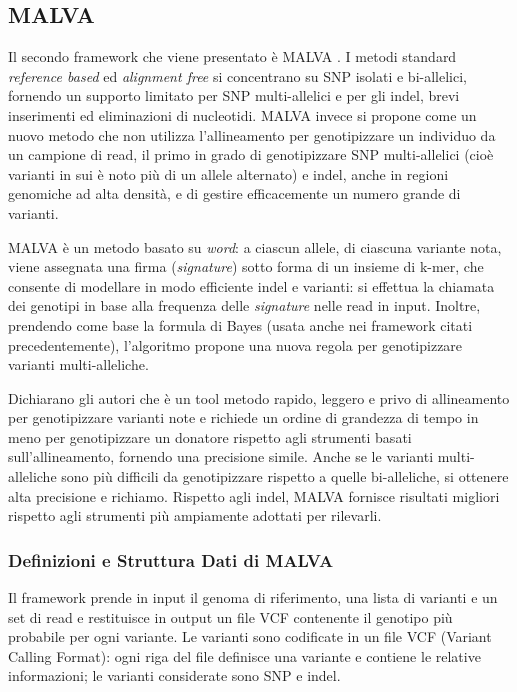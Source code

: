 \documentclass[../main.tex]{subfiles}
\begin{document}
\subsection{MALVA}
\label{malva}

Il secondo framework che viene presentato è MALVA \cite{bernardini2019malva}. I metodi standard \textit{reference based} ed \textit{alignment free} si concentrano su SNP isolati e bi-allelici, fornendo un supporto limitato per SNP multi-allelici e per gli indel, brevi inserimenti ed eliminazioni di nucleotidi. MALVA invece si propone come un nuovo metodo che non utilizza l'allineamento per genotipizzare un individuo da un campione di read, il primo in grado di genotipizzare SNP multi-allelici (cioè varianti in sui è noto più di un allele alternato) e indel, anche in regioni genomiche ad alta densità, e di gestire efficacemente un numero grande di varianti. 

MALVA è un metodo basato su \textit{word}: a ciascun allele, di ciascuna variante nota, viene assegnata una firma (\textit{signature}) sotto forma di un insieme di k-mer, che consente di modellare in modo efficiente indel e varianti: si effettua la chiamata dei genotipi in base alla frequenza delle \textit{signature} nelle read in input. Inoltre, prendendo come base la formula di Bayes (usata anche nei framework citati precedentemente), l'algoritmo propone una nuova regola per genotipizzare varianti multi-alleliche.

Dichiarano gli autori che è un tool metodo rapido, leggero e privo di allineamento per genotipizzare varianti note e richiede un ordine di grandezza di tempo in meno per genotipizzare un donatore rispetto agli strumenti basati sull'allineamento, fornendo una precisione simile. Anche se le varianti multi-alleliche sono più difficili da genotipizzare rispetto a quelle bi-alleliche, si ottenere alta precisione e richiamo. Rispetto agli indel, MALVA fornisce risultati migliori rispetto agli strumenti più ampiamente adottati per rilevarli. 


\subsubsection{Definizioni e Struttura Dati di MALVA}

Il framework prende in input il genoma di riferimento, una lista di varianti e un set di read e restituisce in output un file VCF contenente il genotipo più probabile per ogni variante. Le varianti sono codificate in un file VCF (Variant Calling Format): ogni riga del file definisce una variante e contiene le relative informazioni; le varianti considerate sono SNP e indel.
\end{document}
